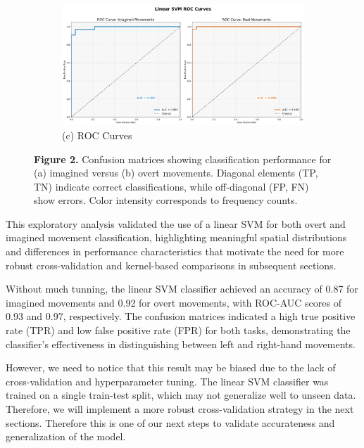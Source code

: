 \documentclass[
  letterpaper,
  DIV=11,
  numbers=noendperiod]{scrartcl}
\begin{document}
\begin{figure}
{\begin{figure}
\centering
\includegraphics[width=1\textwidth,height=\textheight]{figures/linearSVM/roc_curves_linear_SVM.png}
\caption{(c) ROC Curves}\label{fig:roc-curves}
\end{figure}

}

\caption{\label{fig-confusion-matrices}\textbf{Figure 2.} Confusion
matrices showing classification performance for (a) imagined versus (b)
overt movements. Diagonal elements (TP, TN) indicate correct
classifications, while off-diagonal (FP, FN) show errors. Color
intensity corresponds to frequency counts.}

\end{figure}%

This exploratory analysis validated the use of a linear SVM for both
overt and imagined movement classification, highlighting meaningful
spatial distributions and differences in performance characteristics
that motivate the need for more robust cross-validation and kernel-based
comparisons in subsequent sections.

Without much tunning, the linear SVM classifier achieved an accuracy of
0.87 for imagined movements and 0.92 for overt movements, with ROC-AUC
scores of 0.93 and 0.97, respectively. The confusion matrices indicated
a high true positive rate (TPR) and low false positive rate (FPR) for
both tasks, demonstrating the classifier's effectiveness in
distinguishing between left and right-hand movements.

However, we need to notice that this result may be biased due to the
lack of cross-validation and hyperparameter tuning. The linear SVM
classifier was trained on a single train-test split, which may not
generalize well to unseen data. Therefore, we will implement a more
robust cross-validation strategy in the next sections. Therefore this is
one of our next steps to validate accurateness and generalization of the
model.
\end{document}
